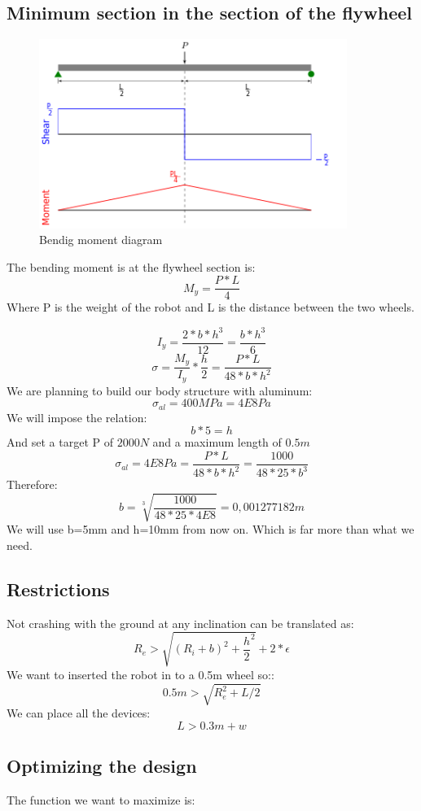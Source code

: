 \subsection{Minimum section in the section of the flywheel}
\begin{figure}[ht]
	\centering
	\includegraphics[width=10cm]{img/Shear_Moment_Diagram.png}
	\caption{Bendig moment diagram}
	\label{fig:Bendig moment diagram}
\end{figure}
The bending moment is at the flywheel section is:
\[M_y = \frac{P * L}{4}\]
Where P is the weight of the robot and L is the distance between the two wheels.



\[I_y = \frac{2*b*h^3}{12}=\frac{b*h^3}{6}\]
\[\sigma=\frac{M_y}{I_y}*\frac{h}{2} = \frac{P*L}{48*b*h^2}\]
We are planning to build our body structure with aluminum:
\[\sigma_{al} = 400MPa = 4E8Pa\]
We will impose the relation:
\[b * 5 = h\]
And set a target P of $2000N$ and a maximum length of $0.5m$
\[\sigma_{al} = 4E8Pa = \frac{P*L}{48*b*h^2} = \frac{1000}{48*25*b^3} \]
Therefore:
\[b = \sqrt[3]{\frac{1000}{48*25*4E8}} = 0,001277182 m\]
We will use b=5mm and h=10mm from now on. Which is far more than what we need.
 
\subsection{Restrictions}
Not crashing with the ground at any inclination can be translated as:
\[R_{e}> \sqrt{(R_{i} + b)^2+\frac{h}{2}^2} + 2*\epsilon\]
We want to inserted the robot in to a 0.5m wheel so::
\[0.5m > \sqrt{R_e^2 + L/2}\]
We can place all the devices:
\[L > 0.3m + w \]

\subsection{Optimizing the design}
The function we want to maximize is:


